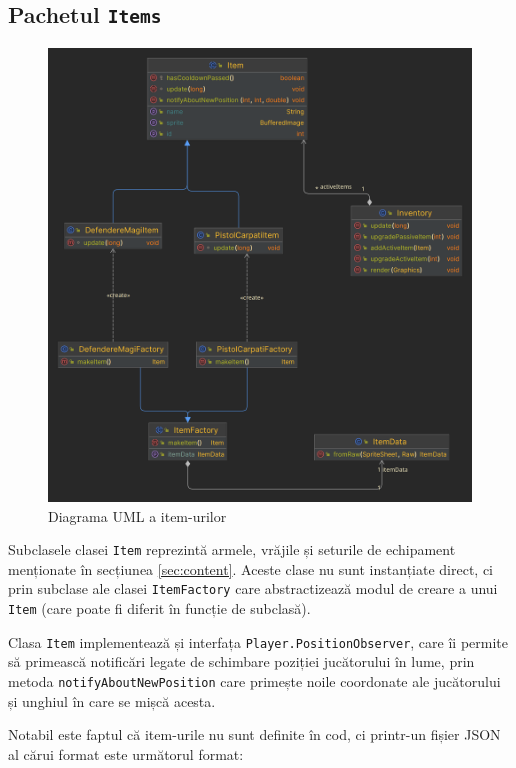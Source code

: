 \documentclass{article}
\begin{document}
    \subsection{Pachetul \texttt{Items}}
    \begin{figure}[H]
        \includegraphics[width=\linewidth]{items-diagram}
        \centering
        \caption{Diagrama UML a item-urilor}
    \end{figure}

    Subclasele clasei \texttt{Item} reprezintă armele, vrăjile și seturile de echipament menționate
    în secțiunea \ref{sec:content}. Aceste clase nu sunt instanțiate direct, ci prin subclase ale
    clasei \texttt{ItemFactory} care abstractizează modul de creare a unui \texttt{Item} (care
    poate fi diferit în funcție de subclasă).

    Clasa \texttt{Item} implementează și interfața \texttt{Player.PositionObserver}, care îi permite
    să primească notificări legate de schimbare poziției jucătorului în lume, prin metoda
    \texttt{notifyAboutNewPosition} care primește noile coordonate ale jucătorului și unghiul în
    care se mișcă acesta.

    Notabil este faptul că item-urile nu sunt definite în cod, ci printr-un fișier JSON al cărui
    format este următorul format:
\end{document}
